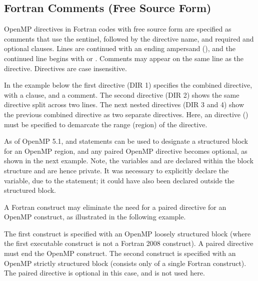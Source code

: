 \begin{fortranspecific}[4ex]
\section{Fortran Comments (Free Source Form)}
\label{sec:fortran_free_format_comments}

OpenMP directives in Fortran codes with free source form are specified as comments
that use the  sentinel, followed by the
directive name, and required and optional clauses.  Lines are continued with an ending ampersand (\scode{&}),
and the continued line begins with  or . Comments may appear on the
same line as the directive.  Directives are case insensitive.

In the example below the first directive (DIR 1) specifies the %
 combined directive, with a  clause, and a comment.
The second directive (DIR 2) shows the same directive split across two lines. 
The next nested directives (DIR 3 and 4) show the previous combined directive as
two separate directives. 
Here, an  directive () must be specified to demarcate the range (region)
of the  directive. 


As of OpenMP 5.1,  and  statements can be used to designate 
a structured block for an OpenMP region, and any paired OpenMP  directive becomes optional,
as shown in the next example.  Note, the variables  and  are declared within the 
block structure and are hence private.
It was necessary to explicitly declare the  variable, due to the  statement; 
it could have also been declared outside the structured block.


A Fortran  construct may eliminate the need for a paired  directive for an OpenMP construct, 
as illustrated in the following example.

The first  construct is specified with an OpenMP loosely structured block 
(where the first executable construct is not a Fortran 2008  construct). 
A paired  directive must end the OpenMP construct.
The second  construct is specified with an OpenMP strictly structured block 
(consists only of a single Fortran  construct). 
The paired  directive is optional in this case, and is not used here.


\end{fortranspecific}
